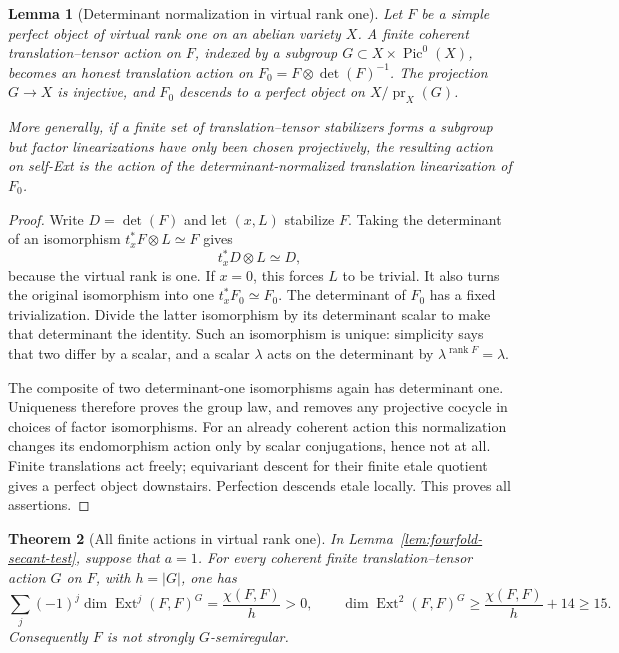 \documentclass[11pt]{article}
\newtheorem{theorem}{Theorem}[section]
\newtheorem{lemma}[theorem]{Lemma}
\theoremstyle{definition}
\theoremstyle{remark}
\begin{document}
\begin{lemma}[Determinant normalization in virtual rank one]
\label{lem:rank-one-determinant-descent}
Let $F$ be a simple perfect object of virtual rank one on an abelian
variety $X$.  A finite coherent translation--tensor action on $F$,
indexed by a subgroup $G\subset X\times\operatorname{Pic}^0(X)$,
becomes an honest translation action on
$F_0=F\otimes\det(F)^{-1}$.  The projection $G\to X$ is injective,
and $F_0$ descends to a perfect object on $X/\operatorname{pr}_X(G)$.

More generally, if a finite set of translation--tensor stabilizers
forms a subgroup but factor linearizations have only been chosen
projectively, the resulting action on self-Ext is the action of
the determinant-normalized translation linearization of $F_0$.
\end{lemma}

\begin{proof}
Write $D=\det(F)$ and let $(x,L)$ stabilize $F$.  Taking the
determinant of an isomorphism $t_x^*F\otimes L\simeq F$ gives
\[
                    t_x^*D\otimes L\simeq D,
\]
because the virtual rank is one.  If $x=0$, this forces $L$ to be
trivial.  It also turns the original isomorphism into one
$t_x^*F_0\simeq F_0$.  The determinant of $F_0$ has a fixed
trivialization.  Divide the latter isomorphism by its determinant
scalar to make that determinant the identity.  Such an isomorphism
is unique: simplicity says that two differ by a scalar, and a
scalar $\lambda$ acts on the determinant by $\lambda^{\operatorname{rank}F}
=\lambda$.

The composite of two determinant-one isomorphisms again has
determinant one.  Uniqueness therefore proves the group law, and
removes any projective cocycle in choices of factor isomorphisms.
For an already coherent action this normalization changes its
endomorphism action only by scalar conjugations, hence not at all.
Finite translations act freely; equivariant descent for their
finite etale quotient gives a perfect object downstairs.  Perfection
descends etale locally.  This proves all assertions.
\end{proof}

\begin{theorem}[All finite actions in virtual rank one]
\label{thm:rank-one-secant-equivariant}
In Lemma~\ref{lem:fourfold-secant-test}, suppose that $a=1$.
For every coherent finite translation--tensor action $G$ on $F$,
with $h=|G|$, one has
\begin{equation}\label{eq:rank-one-secant-invariant-euler}
 \sum_j(-1)^j\dim\operatorname{Ext}^j(F,F)^G
       =\frac{\chi(F,F)}h>0,
 \qquad
 \dim\operatorname{Ext}^2(F,F)^G
       \ge\frac{\chi(F,F)}h+14\ge15.
\end{equation}
Consequently $F$ is not strongly $G$-semiregular.
\end{theorem}
\end{document}
